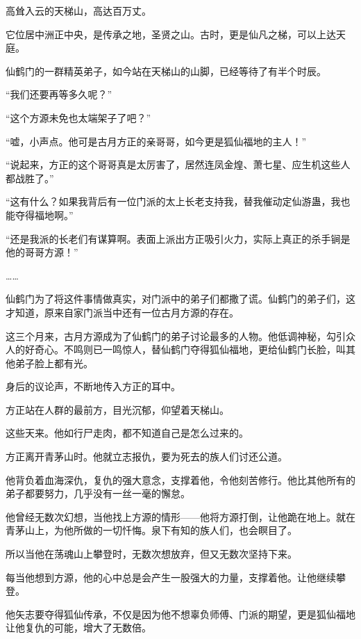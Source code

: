 
\begin{this_body}



高耸入云的天梯山，高达百万丈。

它位居中洲正中央，是传承之地，圣贤之山。古时，更是仙凡之梯，可以上达天庭。

仙鹤门的一群精英弟子，如今站在天梯山的山脚，已经等待了有半个时辰。

“我们还要再等多久呢？”

“这个方源未免也太端架子了吧？”

“嘘，小声点。他可是古月方正的亲哥哥，如今更是狐仙福地的主人！”

“说起来，方正的这个哥哥真是太厉害了，居然连凤金煌、萧七星、应生机这些人都战胜了。”

“这有什么？如果我背后有一位门派的太上长老支持我，替我催动定仙游蛊，我也能夺得福地啊。”

“还是我派的长老们有谋算啊。表面上派出方正吸引火力，实际上真正的杀手锏是他的哥哥方源！”

……

仙鹤门为了将这件事情做真实，对门派中的弟子们都撒了谎。仙鹤门的弟子们，这才知道，原来自家门派当中还有一位古月方源的存在。

这三个月来，古月方源成为了仙鹤门的弟子讨论最多的人物。他低调神秘，勾引众人的好奇心。不鸣则已一鸣惊人，替仙鹤门夺得狐仙福地，更给仙鹤门长脸，叫其他弟子脸上都有光。

身后的议论声，不断地传入方正的耳中。

方正站在人群的最前方，目光沉郁，仰望着天梯山。

这些天来。他如行尸走肉，都不知道自己是怎么过来的。

方正离开青茅山时。他就立志报仇，要为死去的族人们讨还公道。

他背负着血海深仇，复仇的强大意念，支撑着他，令他刻苦修行。他比其他所有的弟子都要努力，几乎没有一丝一毫的懈怠。

他曾经无数次幻想，当他找上方源的情形——他将方源打倒，让他跪在地上。就在青茅山上，为他所做的一切忏悔。泉下有知的族人们，也会瞑目了。

所以当他在荡魂山上攀登时，无数次想放弃，但又无数次坚持下来。

每当他想到方源，他的心中总是会产生一股强大的力量，支撑着他。让他继续攀登。

他矢志要夺得狐仙传承，不仅是因为他不想辜负师傅、门派的期望，更是狐仙福地让他复仇的可能，增大了无数倍。


\end{this_body}
